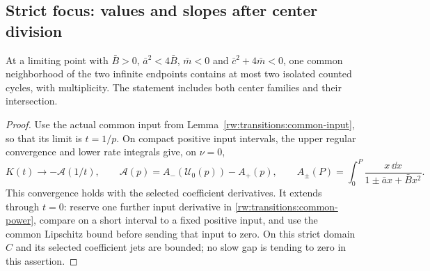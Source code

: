 \subsection{Strict focus: values and slopes after center division}

\begin{proposition}\label{rw:infinity:strict-focus}
At a limiting point with
$\bar B>0$, $\bar a^2<4\bar B$, $\bar m<0$ and
$\bar c^2+4\bar m<0$, one common neighborhood of the two infinite
endpoints contains at most two isolated counted cycles, with
multiplicity. The statement includes both center families and their
intersection.
\end{proposition}
\begin{proof}
Use the actual common input from
Lemma~\ref{rw:transitions:common-input}, so that its limit is $t=1/p$.
On compact positive input intervals, the upper regular convergence
and lower rate integrals give, on $\nu=0$,
\[
 K(t)\longrightarrow-\mathcal A(1/t),\qquad
 \mathcal A(p)=A_-(\mathcal U_0(p))-A_+(p),\qquad
 A_\pm(P)=\int_0^P\frac{x\,\dd x}{1\pm\bar ax+\bar Bx^2}.
\]
This convergence holds with the selected coefficient derivatives.
It extends through $t=0$: reserve one further input derivative in
\eqref{rw:transitions:common-power}, compare on a short interval to a fixed
positive input, and use the common Lipschitz bound before sending that
input to zero. On this strict domain $C$ and its selected coefficient
jets are bounded; no slow gap is tending to zero in this assertion.


\end{proof}
